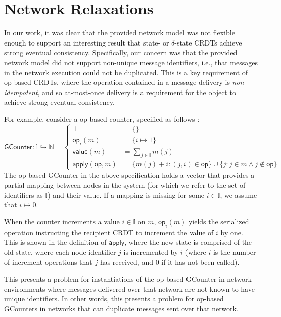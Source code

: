 \section{Network Relaxations}
In our work, it was clear that the provided network model was not flexible
enough to support an interesting result that state- or $\delta$-state
CRDTs achieve strong eventual consistency. Specifically, our concern was that
the provided network model did not support non-unique message identifiers, i.e.,
that messages in the network execution could not be duplicated. This is a key
requirement of op-based CRDTs, where the operation contained in a message
delivery is \textit{non-idempotent}, and so at-most-once delivery is a
requirement for the object to achieve strong eventual consistency.

For example, consider a op-based counter, specified as follows :
\[
\mathsf{GCounter}
  : \mathbb{I} \hookrightarrow \mathbb{N}
  = \left\{
      \begin{aligned}
        \bot &= \{\} \\
        \mathsf{op}_i(m) &= \{ i \mapsto 1 \} \\
        \mathsf{value}(m) &= \sum_{j \in \mathbb{I}} m(j) \\
        \mathsf{apply}(\mathsf{op}, m) &= \{
          m(j) + i : (j, i) \in \mathsf{op}
        \} \cup \{ j : j \in m \land j \notin \mathsf{op} \}
      \end{aligned}
    \right.
\]
The op-based GCounter in the above specification holds a vector that provides a
partial mapping between nodes in the system (for which we refer to the set of
identifiers as $\mathbb{I}$) and their value. If a mapping is missing for some
$i \in \mathbb{I}$, we assume that $i \mapsto 0$.

When the counter increments a value $i \in \mathbb{I}$ on $m$,
$\mathsf{op}_i(m)$ yields the serialized operation instructing the recipient
CRDT to increment the value of $i$ by one. This is shown in the definition of
$\mathsf{apply}$, where the new state is comprised of the old state, where each
node identifier $j$ is incremented by $i$ (where $i$ is the number of increment
operations that $j$ has received, and $0$ if it has not been called).

This presents a problem for instantiations of the op-based GCounter in network
environments where messages delivered over that network are not known to have
unique identifiers. In other words, this presents a problem for op-based
GCounters in networks that can duplicate messages sent over that network.

